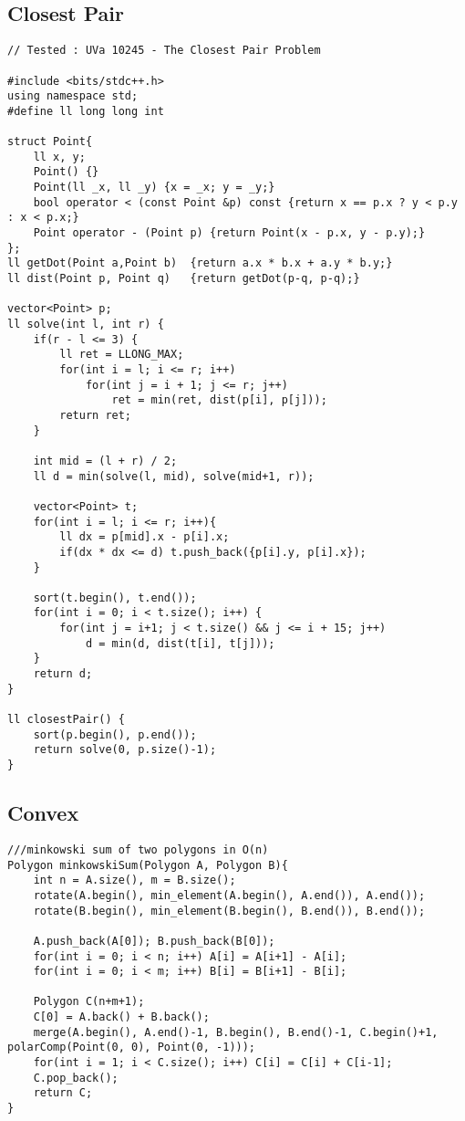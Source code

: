 \documentclass[FSZ,a4paper,onesided]{article}
\begin{document}
\begin{multicols*}{\COLS}
\subsection{Closest Pair}
\begin{lstlisting}
// Tested : UVa 10245 - The Closest Pair Problem

#include <bits/stdc++.h>
using namespace std;
#define ll long long int

struct Point{
    ll x, y;
    Point() {}
    Point(ll _x, ll _y) {x = _x; y = _y;}
    bool operator < (const Point &p) const {return x == p.x ? y < p.y : x < p.x;}
    Point operator - (Point p) {return Point(x - p.x, y - p.y);}
};
ll getDot(Point a,Point b)  {return a.x * b.x + a.y * b.y;}
ll dist(Point p, Point q)   {return getDot(p-q, p-q);}

vector<Point> p;
ll solve(int l, int r) {
    if(r - l <= 3) {
        ll ret = LLONG_MAX;
        for(int i = l; i <= r; i++)
            for(int j = i + 1; j <= r; j++)
                ret = min(ret, dist(p[i], p[j]));
        return ret;
    }

    int mid = (l + r) / 2;
    ll d = min(solve(l, mid), solve(mid+1, r));

    vector<Point> t;
    for(int i = l; i <= r; i++){
        ll dx = p[mid].x - p[i].x;
        if(dx * dx <= d) t.push_back({p[i].y, p[i].x});
    }

    sort(t.begin(), t.end());
    for(int i = 0; i < t.size(); i++) {
        for(int j = i+1; j < t.size() && j <= i + 15; j++)
            d = min(d, dist(t[i], t[j]));
    }
    return d;
}

ll closestPair() {
    sort(p.begin(), p.end());
    return solve(0, p.size()-1);
}
\end{lstlisting}
\subsection{Convex}
\begin{lstlisting}
///minkowski sum of two polygons in O(n)
Polygon minkowskiSum(Polygon A, Polygon B){
    int n = A.size(), m = B.size();
    rotate(A.begin(), min_element(A.begin(), A.end()), A.end());
    rotate(B.begin(), min_element(B.begin(), B.end()), B.end());

    A.push_back(A[0]); B.push_back(B[0]);
    for(int i = 0; i < n; i++) A[i] = A[i+1] - A[i];
    for(int i = 0; i < m; i++) B[i] = B[i+1] - B[i];

    Polygon C(n+m+1);
    C[0] = A.back() + B.back();
    merge(A.begin(), A.end()-1, B.begin(), B.end()-1, C.begin()+1, polarComp(Point(0, 0), Point(0, -1)));
    for(int i = 1; i < C.size(); i++) C[i] = C[i] + C[i-1];
    C.pop_back();
    return C;
}


\end{lstlisting}
\end{multicols*}
\end{document}

